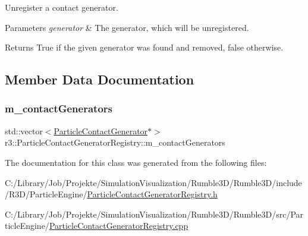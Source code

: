 Unregister a contact generator. 


\begin{DoxyParams}{Parameters}
{\em generator} & The generator, which will be unregistered. \\
\hline
\end{DoxyParams}
\begin{DoxyReturn}{Returns}
True if the given generator was found and removed, false otherwise. 
\end{DoxyReturn}


\subsection{Member Data Documentation}
\mbox{\label{classr3_1_1_particle_contact_generator_registry_abefd730c20539681ed0fac53ccd5f8ab}} 
\subsubsection{\texorpdfstring{m\+\_\+contact\+Generators}{m\_contactGenerators}}
{\footnotesize\ttfamily std\+::vector$<$\mbox{\hyperlink{classr3_1_1_particle_contact_generator}{Particle\+Contact\+Generator}}$\ast$$>$ r3\+::\+Particle\+Contact\+Generator\+Registry\+::m\+\_\+contact\+Generators\hspace{0.3cm}{\ttfamily [protected]}}



The documentation for this class was generated from the following files\+:\begin{DoxyCompactItemize}
\item 
C\+:/\+Library/\+Job/\+Projekte/\+Simulation\+Visualization/\+Rumble3\+D/\+Rumble3\+D/include/\+R3\+D/\+Particle\+Engine/\mbox{\hyperlink{_particle_contact_generator_registry_8h}{Particle\+Contact\+Generator\+Registry.\+h}}\item 
C\+:/\+Library/\+Job/\+Projekte/\+Simulation\+Visualization/\+Rumble3\+D/\+Rumble3\+D/src/\+Particle\+Engine/\mbox{\hyperlink{_particle_contact_generator_registry_8cpp}{Particle\+Contact\+Generator\+Registry.\+cpp}}\end{DoxyCompactItemize}
